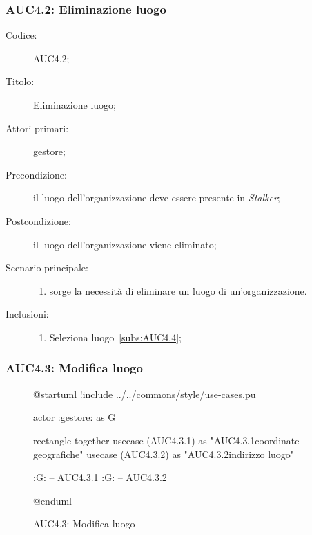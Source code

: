 \subsubsection{AUC4.2: Eliminazione luogo}%
\label{subs:AUC4.2}
\begin{description}
  \item[Codice:] AUC4.2;
  \item[Titolo:] Eliminazione luogo;
  \item[Attori primari:] gestore;
  \item[Precondizione:] il luogo dell'organizzazione deve essere presente in \emph{Stalker};
  \item[Postcondizione:] il luogo dell'organizzazione viene eliminato;
  \item[Scenario principale:]
  \begin{enumerate}
    \item sorge la necessità di eliminare un luogo di un'organizzazione.
  \end{enumerate}
  \item[Inclusioni:]
  \begin{enumerate}
    \item Seleziona luogo~\ref{subs:AUC4.4};
  \end{enumerate}
\end{description}

\subsubsection{AUC4.3: Modifica luogo}%
\label{subs:AUC4.3}

\begin{figure}[H]
  \centering
  \begin{plantuml}
  @startuml
  !include ../../commons/style/use-cases.pu

  actor :gestore: as G

  rectangle {
    together {
      usecase (AUC4.3.1) as "AUC4.3.1\nModifica coordinate geografiche"
      usecase (AUC4.3.2) as "AUC4.3.2\nModifica indirizzo luogo"
    }
  }

  :G: -- AUC4.3.1
  :G: -- AUC4.3.2

  @enduml
  \end{plantuml}
  \caption{AUC4.3: Modifica luogo}%
  \label{fig:AUC3_3_3_3}
\end{figure}

